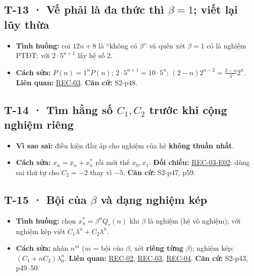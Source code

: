 \documentclass[
  10pt,
  twoside,openany]{book}
\providecommand{\tightlist}{%
  \setlength{\itemsep}{0pt}\setlength{\parskip}{0pt}}
\begin{document}
\hypertarget{T-13}{%
\subsection{\texorpdfstring{T-13 · Vế phải là đa thức thì \(\beta=1\);
viết lại lũy
thừa}{T-13 · Vế phải là đa thức thì \textbackslash beta=1; viết lại lũy thừa}}\label{T-13}}

\begin{itemize}
\tightlist
\item
  \textbf{Tình huống:} coi \(12n+8\) là ``không có \(\beta\)'' và quên
  xét \(\beta=1\) có là nghiệm PTĐT; với \(2\cdot5^{n+1}\) lấy hệ số 2.
\item
  \textbf{Cách sửa:} \(P(n)=1^nP(n)\); \(2\cdot5^{n+1}=10\cdot5^n\);
  \((2-n)2^{n-2}=\frac{2-n}{4}2^n\). \textbf{Liên quan:}
  \protect\hyperlink{REC-03}{REC-03}. \textbf{Căn cứ:} S2-p48.
\end{itemize}

\hypertarget{T-14}{%
\subsection{\texorpdfstring{T-14 · Tìm hằng số \(C_1,C_2\) trước khi
cộng nghiệm
riêng}{T-14 · Tìm hằng số C\_1,C\_2 trước khi cộng nghiệm riêng}}\label{T-14}}

\begin{itemize}
\tightlist
\item
  \textbf{Vì sao sai:} điều kiện đầu áp cho nghiệm của hệ \textbf{không
  thuần nhất}.
\item
  \textbf{Cách sửa:} \(x_n=\bar x_n+x_n^*\) rồi mới thế \(x_0,x_1\).
  \textbf{Đối chiếu:} \protect\hyperlink{REC-03-E02}{REC-03-E02}: dùng
  sai thứ tự cho \(C_2=-2\) thay vì \(-5\). \textbf{Căn cứ:} S2-p47,
  p59.
\end{itemize}

\hypertarget{T-15}{%
\subsection{\texorpdfstring{T-15 · Bội của \(\beta\) và dạng nghiệm
kép}{T-15 · Bội của \textbackslash beta và dạng nghiệm kép}}\label{T-15}}

\begin{itemize}
\tightlist
\item
  \textbf{Tình huống:} chọn \(x_n^*=\beta^nQ_r(n)\) khi \(\beta\) là
  nghiệm (hệ vô nghiệm); với nghiệm kép viết
  \(C_1\lambda^n+C_2\lambda^n\).
\item
  \textbf{Cách sửa:} nhân \(n^m\) (\(m\) = bội của \(\beta\), xét
  \textbf{riêng từng} \(\beta\)); nghiệm kép: \((C_1+nC_2)\lambda_0^n\).
  \textbf{Liên quan:} \protect\hyperlink{REC-02}{REC-02},
  \protect\hyperlink{REC-03}{REC-03},
  \protect\hyperlink{REC-04}{REC-04}. \textbf{Căn cứ:} S2-p43, p49--50.
\end{itemize}
\end{document}
